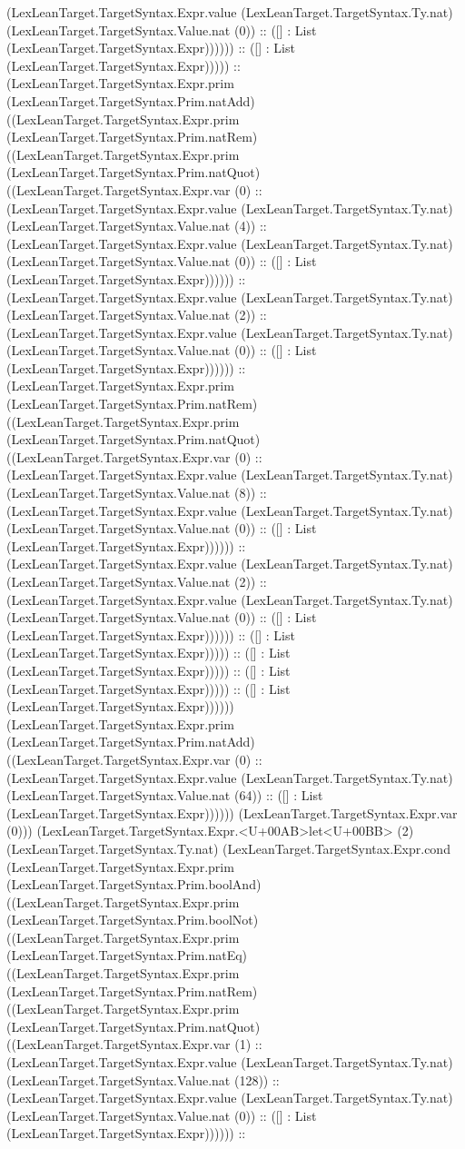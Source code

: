 \documentclass[11pt]{article}
\begin{document}
(LexLeanTarget.TargetSyntax.Expr.value (LexLeanTarget.TargetSyntax.Ty.nat) (LexLeanTarget.TargetSyntax.Value.nat (0)) :: ([] : List (LexLeanTarget.TargetSyntax.Expr)))))) :: ([] : List (LexLeanTarget.TargetSyntax.Expr))))) :: (LexLeanTarget.TargetSyntax.Expr.prim (LexLeanTarget.TargetSyntax.Prim.natAdd) ((LexLeanTarget.TargetSyntax.Expr.prim (LexLeanTarget.TargetSyntax.Prim.natRem) ((LexLeanTarget.TargetSyntax.Expr.prim (LexLeanTarget.TargetSyntax.Prim.natQuot) ((LexLeanTarget.TargetSyntax.Expr.var (0) :: (LexLeanTarget.TargetSyntax.Expr.value (LexLeanTarget.TargetSyntax.Ty.nat) (LexLeanTarget.TargetSyntax.Value.nat (4)) :: (LexLeanTarget.TargetSyntax.Expr.value (LexLeanTarget.TargetSyntax.Ty.nat) (LexLeanTarget.TargetSyntax.Value.nat (0)) :: ([] : List (LexLeanTarget.TargetSyntax.Expr)))))) :: (LexLeanTarget.TargetSyntax.Expr.value (LexLeanTarget.TargetSyntax.Ty.nat) (LexLeanTarget.TargetSyntax.Value.nat (2)) :: (LexLeanTarget.TargetSyntax.Expr.value (LexLeanTarget.TargetSyntax.Ty.nat) (LexLeanTarget.TargetSyntax.Value.nat (0)) :: ([] : List (LexLeanTarget.TargetSyntax.Expr)))))) :: (LexLeanTarget.TargetSyntax.Expr.prim (LexLeanTarget.TargetSyntax.Prim.natRem) ((LexLeanTarget.TargetSyntax.Expr.prim (LexLeanTarget.TargetSyntax.Prim.natQuot) ((LexLeanTarget.TargetSyntax.Expr.var (0) :: (LexLeanTarget.TargetSyntax.Expr.value (LexLeanTarget.TargetSyntax.Ty.nat) (LexLeanTarget.TargetSyntax.Value.nat (8)) :: (LexLeanTarget.TargetSyntax.Expr.value (LexLeanTarget.TargetSyntax.Ty.nat) (LexLeanTarget.TargetSyntax.Value.nat (0)) :: ([] : List (LexLeanTarget.TargetSyntax.Expr)))))) :: (LexLeanTarget.TargetSyntax.Expr.value (LexLeanTarget.TargetSyntax.Ty.nat) (LexLeanTarget.TargetSyntax.Value.nat (2)) :: (LexLeanTarget.TargetSyntax.Expr.value (LexLeanTarget.TargetSyntax.Ty.nat) (LexLeanTarget.TargetSyntax.Value.nat (0)) :: ([] : List (LexLeanTarget.TargetSyntax.Expr)))))) :: ([] : List (LexLeanTarget.TargetSyntax.Expr))))) :: ([] : List (LexLeanTarget.TargetSyntax.Expr))))) :: ([] : List (LexLeanTarget.TargetSyntax.Expr))))) :: ([] : List (LexLeanTarget.TargetSyntax.Expr)))))) (LexLeanTarget.TargetSyntax.Expr.prim (LexLeanTarget.TargetSyntax.Prim.natAdd) ((LexLeanTarget.TargetSyntax.Expr.var (0) :: (LexLeanTarget.TargetSyntax.Expr.value (LexLeanTarget.TargetSyntax.Ty.nat) (LexLeanTarget.TargetSyntax.Value.nat (64)) :: ([] : List (LexLeanTarget.TargetSyntax.Expr)))))) (LexLeanTarget.TargetSyntax.Expr.var (0))) (LexLeanTarget.TargetSyntax.Expr.<U+00AB>let<U+00BB> (2) (LexLeanTarget.TargetSyntax.Ty.nat) (LexLeanTarget.TargetSyntax.Expr.cond (LexLeanTarget.TargetSyntax.Expr.prim (LexLeanTarget.TargetSyntax.Prim.boolAnd) ((LexLeanTarget.TargetSyntax.Expr.prim (LexLeanTarget.TargetSyntax.Prim.boolNot) ((LexLeanTarget.TargetSyntax.Expr.prim (LexLeanTarget.TargetSyntax.Prim.natEq) ((LexLeanTarget.TargetSyntax.Expr.prim (LexLeanTarget.TargetSyntax.Prim.natRem) ((LexLeanTarget.TargetSyntax.Expr.prim (LexLeanTarget.TargetSyntax.Prim.natQuot) ((LexLeanTarget.TargetSyntax.Expr.var (1) :: (LexLeanTarget.TargetSyntax.Expr.value (LexLeanTarget.TargetSyntax.Ty.nat) (LexLeanTarget.TargetSyntax.Value.nat (128)) :: (LexLeanTarget.TargetSyntax.Expr.value (LexLeanTarget.TargetSyntax.Ty.nat) (LexLeanTarget.TargetSyntax.Value.nat (0)) :: ([] : List (LexLeanTarget.TargetSyntax.Expr)))))) :: 
\end{document}
